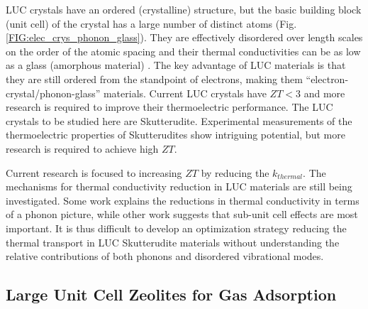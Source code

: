 \documentclass[letterpaper,12pt]{article}
\begin{document}
LUC crystals have an ordered (crystalline) structure, but the basic building block (unit cell) of the crystal has a large number of distinct atoms (Fig. \ref{FIG:elec_crys_phonon_glass}).\cite{cm052055b,Yang_Chen_2006,wang_232107}  They are effectively disordered over length scales on the order of the atomic spacing and their thermal conductivities can be as low as a glass (amorphous material) \cite{cm052055b,Yang_Chen_2006,wang_232107}. The key advantage of LUC materials is that they are still ordered from the standpoint of electrons, making them “electron-crystal/phonon-glass” materials. Current LUC crystals have $ZT < 3$ \cite{cm052055b,Yang_Chen_2006,wang_232107} and more research is required to improve their thermoelectric performance.  The LUC crystals to be studied here are Skutterudite.\cite{cm052055b}  Experimental measurements of the thermoelectric properties of Skutterudites show intriguing potential,\cite{cm052055b,Yang_Chen_2006,wang_232107} but more research is required to achieve high $ZT$.  

Current research is focused to increasing $ZT$ by reducing the $k_{thermal}$.\cite{keppens1998,Sales_Chakoumakos_Mandrus_Sharp_1999,doi:10.1021/ja063695y} The mechanisms for thermal conductivity reduction in LUC materials are still being investigated.\cite{Sales_Chakoumakos_Mandrus_Sharp_1999,qiu:063713} Some work explains the reductions in thermal conductivity in terms of a phonon picture,\cite{Toberer2011,Yang_Chen_2006,Christensen2008} while other work suggests that sub-unit cell effects are most important.\cite{PhysRevLett.82.779} It is thus difficult to develop an optimization strategy reducing the thermal transport in LUC Skutterudite materials without understanding the relative contributions of both phonons and disordered vibrational modes.

\subsection{\label{S-Motivation-Zeolites}Large Unit Cell Zeolites for Gas Adsorption }
\end{document}

